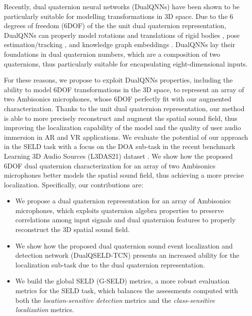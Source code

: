 \documentclass[3p, preprint, twocolumn]{elsarticle}
\begin{document}
Recently, dual quaternion neural networks (DualQNNs) have been shown to be particularly suitable for modelling transformations in $3$D space. Due to the $6$ degrees of freedom (6DOF) of the the unit dual quaternion representation, DualQNNs can properly model rotations and translations of rigid bodies \cite{Poppelbaum2021DQRigid, Schwung2021RigidBody, Schilling2019HierarchicalDQ, TsiotrasDualQuat2020}, pose estimation/tracking \cite{Sveier2021DualQ, Gui2021DualQ}, and knowledge graph embeddings \cite{CaoDual2021, Nguyen2022NodeCB}. DualQNNs lay their foundations in dual quaternion numbers, which are a composition of two quaternions, thus particularly suitable for encapsulating eight-dimensional inputs.

For these reasons, we propose to exploit DualQNNs properties, including the ability to model 6DOF transformations in the $3$D space, to represent an array of two Ambisonics microphones, whose 6DOF \cite{Plinge2018SixDegreesofFreedomBA} perfectly fit with our augmented characterization. Thanks to the unit dual quaternion representation, our method is able to more precisely reconstruct and augment the spatial sound field, thus improving the localization capability of the model and the quality of user audio immersion in AR and VR applications. We evaluate the potential of our approach in the SELD task with a focus on the DOA sub-task in the recent benchmark Learning 3D Audio Sources (L3DAS21) dataset \cite{guizzo2021l3das21}. We show how the proposed 6DOF dual quaternion characterization for an array of two Ambisonics microphones better models the spatial sound field, thus achieving a more precise localization. Specifically, our contributions are:

\begin{itemize}
    \item We propose a dual quaternion representation for an array of Ambisonics microphones, which exploits quaternion algebra properties to preserve correlations among input signals and dual quaternion features to properly reconstruct the $3$D spatial sound field.
    \item We show how the proposed dual quaternion sound event localization and detection network (DualQSELD-TCN) presents an increased ability for the localization sub-task due to the dual quaternion representation.
\item We build the global SELD (G-SELD) metrics, a more robust evaluation metrics for the SELD task, which balances the assessments computed with both the \textit{location-sensitive detection} metrics and the \textit{class-sensitive localization} metrics.  
\end{itemize}
\end{document}
